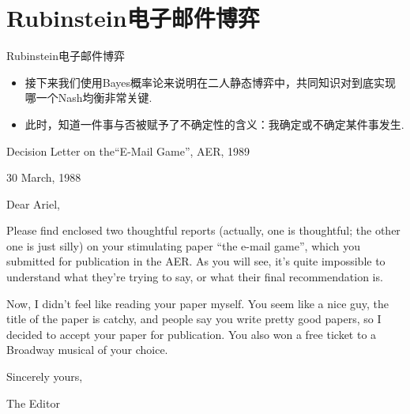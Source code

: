 \section{Rubinstein电子邮件博弈}
\begin{frame}{Rubinstein电子邮件博弈}
\begin{itemize}
    \item 接下来我们使用Bayes概率论来说明在二人静态博弈中，共同知识对到底实现哪一个Nash均衡非常关键.
    \item 此时，知道一件事与否被赋予了不确定性的含义：我确定或不确定某件事发生.
\end{itemize}
\end{frame}
\begin{frame}{Decision Letter on the``E-Mail Game'', AER, 1989}
\begin{center}
    \begin{minipage}[c]{0.8\textwidth}
\footnotesize
\hfill 30 March, 1988

Dear Ariel,

\hfill

Please find enclosed two thoughtful reports (actually, one is thoughtful; the other one is just silly) on your stimulating paper ``the e-mail game'', which you submitted for publication in the AER. As you will see, it's quite impossible to understand what they're trying to say, or what their final recommendation is.

Now, I didn't feel like reading your paper myself. You seem like a nice guy, the title of the paper is catchy, and people say you write pretty good papers, so I decided to accept your paper for publication. You also won a free ticket to a Broadway musical of your choice.

\hfill

Sincerely yours, 

The Editor
\end{minipage}
\end{center}
\end{frame}

